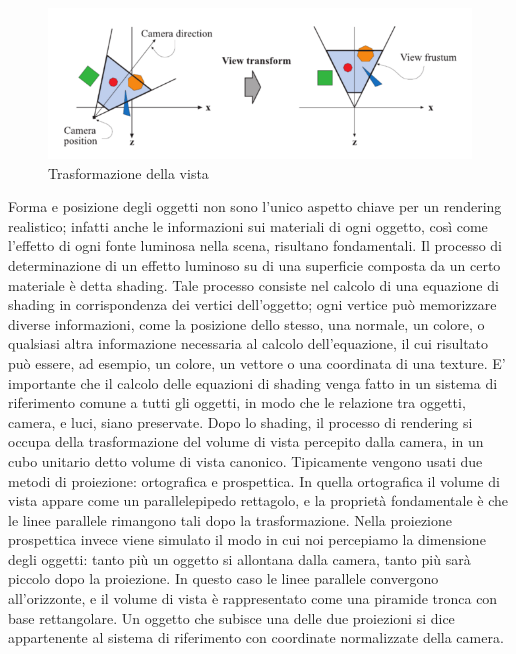\begin{figure}[htb]
 \centering
 \includegraphics[width=1.0\linewidth]{images/chapter_stato_arte/stato_arte_view_transform.png}\hfill
 \caption[Trasformazione della vista]{Trasformazione della vista}
 \label{fig:stato_arte_trasfvista}
\end{figure}

Forma e posizione degli oggetti non sono l’unico aspetto chiave per un rendering realistico; infatti anche le informazioni sui materiali di ogni oggetto, così come l’effetto di ogni fonte luminosa nella scena, risultano fondamentali. 
Il processo di determinazione di un effetto luminoso su di una superficie composta da un certo materiale è detta shading. Tale processo consiste nel calcolo di una equazione di shading in corrispondenza dei vertici dell’oggetto; ogni vertice può memorizzare diverse informazioni, come la posizione dello stesso, una normale, un colore, o qualsiasi altra informazione necessaria al calcolo dell’equazione, il cui risultato può essere, ad esempio, un colore, un vettore o una coordinata di una texture. E’ importante che il calcolo delle equazioni di shading venga fatto in un sistema di riferimento comune a tutti gli oggetti, in modo che le relazione tra oggetti, camera, e luci, siano preservate. 
Dopo lo shading, il processo di rendering si occupa della trasformazione del volume di vista percepito dalla camera, in un cubo unitario detto volume di vista canonico.
Tipicamente vengono usati due metodi di proiezione: ortografica e prospettica.
In quella ortografica il volume di vista appare come un parallelepipedo rettagolo, e la proprietà fondamentale è che le linee parallele rimangono tali dopo la trasformazione.
Nella proiezione prospettica invece viene simulato il modo in cui noi percepiamo la dimensione degli oggetti: tanto più un oggetto si allontana dalla camera, tanto più sarà piccolo dopo la proiezione. In questo caso le linee parallele convergono all’orizzonte, e il volume di vista è rappresentato come una piramide tronca con base rettangolare.
Un oggetto che subisce una delle due proiezioni  si dice appartenente al sistema di riferimento con coordinate normalizzate della camera. 

